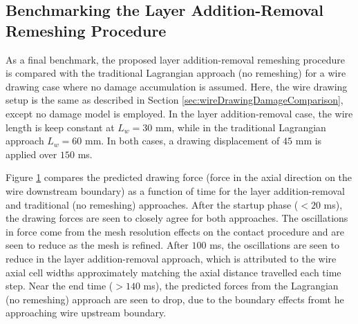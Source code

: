 \documentclass[sn-mathphys,Numbered]{sn-jnl}%
\begin{document}
\subsection{Benchmarking the Layer Addition-Removal Remeshing Procedure}
As a final benchmark, the proposed layer addition-removal remeshing procedure is compared with the traditional Lagrangian approach (no remeshing) for a wire drawing case where no damage accumulation is assumed.
Here, the wire drawing setup is the same as described in Section \ref{sec:wireDrawingDamageComparison}, except no damage model is employed.
In the layer addition-removal case, the wire length is keep constant at $L_w = 30$ mm, while in the traditional Lagrangian approach $L_w = 60$ mm.
In both cases, a drawing displacement of $45$ mm is applied over $150$ ms.

Figure \ref{fig:benchmarkLayersForces} compares the predicted drawing force (force in the axial direction on the wire downstream boundary) as a function of time for the layer addition-removal and traditional (no remeshing) approaches.
After the startup phase ($< 20$ ms), the drawing forces are seen to closely agree for both approaches.
The oscillations in force come from the mesh resolution effects on the contact procedure and are seen to reduce as the mesh is refined.
After $100$ ms, the oscillations are seen to reduce in the layer addition-removal approach, which is attributed to the wire axial cell widths approximately matching the axial distance travelled each time step.
Near the end time ($> 140$ ms), the predicted forces from the Lagrangian (no remeshing) approach are seen to drop, due to the boundary effects fromt he approaching wire upstream boundary.
\begin{figure}[htb]
	\centering
	\label{fig:benchmarkLayersForces}
\end{figure}
\end{document}
